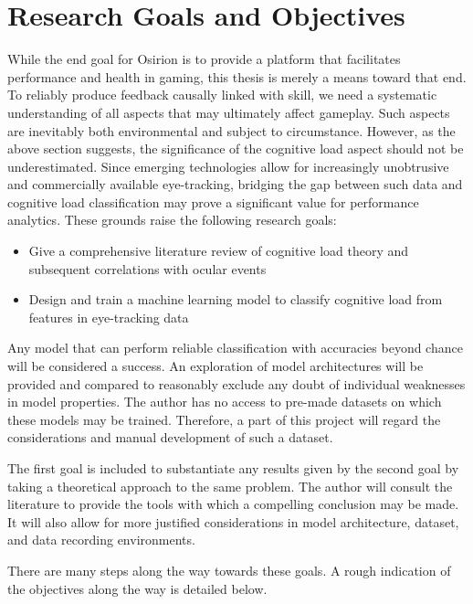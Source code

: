 \section{Research Goals and Objectives} \label{sec:intro/research_goals}

While the end goal for Osirion is to provide a platform that facilitates performance and health in gaming, this thesis is merely a means toward that end. To reliably produce feedback causally linked with skill, we need a systematic understanding of all aspects that may ultimately affect gameplay. Such aspects are inevitably both environmental and subject to circumstance. However, as the above section suggests, the significance of the cognitive load aspect should not be underestimated. Since emerging technologies allow for increasingly unobtrusive and commercially available eye-tracking, bridging the gap between such data and cognitive load classification may prove a significant value for performance analytics. These grounds raise the following research goals:

\begin{itemize}
    \item Give a comprehensive literature review of cognitive load theory and subsequent correlations with ocular events
    \item Design and train a machine learning model to classify cognitive load from features in eye-tracking data
\end{itemize}

Any model that can perform reliable classification with accuracies beyond chance will be considered a success. An exploration of model architectures will be provided and compared to reasonably exclude any doubt of individual weaknesses in model properties. The author has no access to pre-made datasets on which these models may be trained. Therefore, a part of this project will regard the considerations and manual development of such a dataset.

\newpage
The first goal is included to substantiate any results given by the second goal by taking a theoretical approach to the same problem. The author will consult the literature to provide the tools with which a compelling conclusion may be made. It will also allow for more justified considerations in model architecture, dataset, and data recording environments.

There are many steps along the way towards these goals. A rough indication of the objectives along the way is detailed below.

